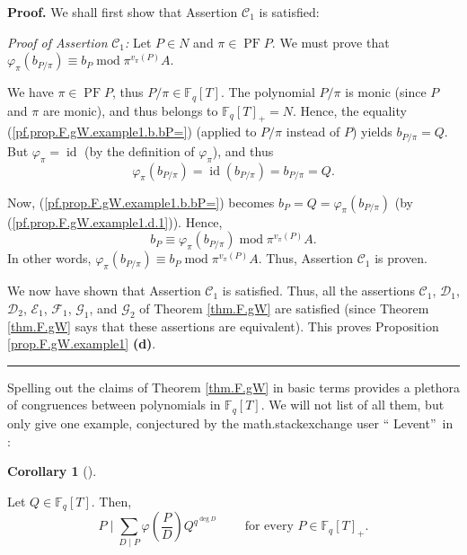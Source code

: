 \documentclass[numbers=enddot,12pt,final,onecolumn,notitlepage]{scrartcl}%
\theoremstyle{definition}
\newtheorem{coro}[theo]{Corollary}
\newenvironment{corollary}[1][]
{\begin{coro}[#1]\begin{leftbar}}
{\end{leftbar}\end{coro}}
\newenvironment{proof}[1][Proof]{\noindent\textbf{#1.} }{\ \rule{0.5em}{0.5em}}
\let\sumnonlimits\sum
\renewcommand{\sum}{\sumnonlimits\limits}
\begin{document}
\begin{proof}
We shall first show that Assertion $\mathcal{C}_{1}$ is satisfied:

\textit{Proof of Assertion }$\mathcal{C}_{1}$\textit{:} Let $P\in N$ and
$\pi\in\operatorname*{PF}P$. We must prove that $\varphi_{\pi}\left(
b_{P/\pi}\right)  \equiv b_{P}\operatorname{mod}\pi^{v_{\pi}\left(  P\right)
}A$.

We have $\pi\in\operatorname*{PF}P$, thus $P/\pi\in\mathbb{F}_{q}\left[
T\right]  $. The polynomial $P/\pi$ is monic (since $P$ and $\pi$ are monic),
and thus belongs to $\mathbb{F}_{q}\left[  T\right]  _{+}=N$. Hence, the
equality (\ref{pf.prop.F.gW.example1.b.bP=}) (applied to $P/\pi$ instead of
$P$) yields $b_{P/\pi}=Q$. But $\varphi_{\pi}=\operatorname*{id}$ (by the
definition of $\varphi_{\pi}$), and thus%
\begin{equation}
\varphi_{\pi}\left(  b_{P/\pi}\right)  =\operatorname*{id}\left(  b_{P/\pi
}\right)  =b_{P/\pi}=Q. \label{pf.prop.F.gW.example1.d.1}%
\end{equation}


Now, (\ref{pf.prop.F.gW.example1.b.bP=}) becomes $b_{P}=Q=\varphi_{\pi}\left(
b_{P/\pi}\right)  $ (by (\ref{pf.prop.F.gW.example1.d.1})). Hence,%
\[
b_{P}\equiv\varphi_{\pi}\left(  b_{P/\pi}\right)  \operatorname{mod}%
\pi^{v_{\pi}\left(  P\right)  }A.
\]
In other words, $\varphi_{\pi}\left(  b_{P/\pi}\right)  \equiv b_{P}%
\operatorname{mod}\pi^{v_{\pi}\left(  P\right)  }A$. Thus, Assertion
$\mathcal{C}_{1}$ is proven.

We now have shown that Assertion $\mathcal{C}_{1}$ is satisfied. Thus, all the
assertions $\mathcal{C}_{1}$, $\mathcal{D}_{1}$, $\mathcal{D}_{2}$,
$\mathcal{E}_{1}$, $\mathcal{F}_{1}$, $\mathcal{G}_{1}$, and $\mathcal{G}_{2}$
of Theorem \ref{thm.F.gW} are satisfied (since Theorem \ref{thm.F.gW} says
that these assertions are equivalent). This proves Proposition
\ref{prop.F.gW.example1} \textbf{(d)}.
\end{proof}

Spelling out the claims of Theorem \ref{thm.F.gW} in basic terms provides a
plethora of congruences between polynomials in $\mathbb{F}_{q}\left[
T\right]  $. We will not list of all them, but only give one example,
conjectured by the math.stackexchange user \textquotedblleft
Levent\textquotedblright\ in \cite{levent}:

\begin{corollary}
\label{cor.F.gW.example1.levent}Let $Q\in\mathbb{F}_{q}\left[  T\right]  $.
Then,%
\[
P\mid\sum_{D\mid P}\varphi\left(  \dfrac{P}{D}\right)  Q^{q^{\deg D}%
}\ \ \ \ \ \ \ \ \ \ \text{for every }P\in\mathbb{F}_{q}\left[  T\right]
_{+}.
\]

\end{corollary}
\end{document}
